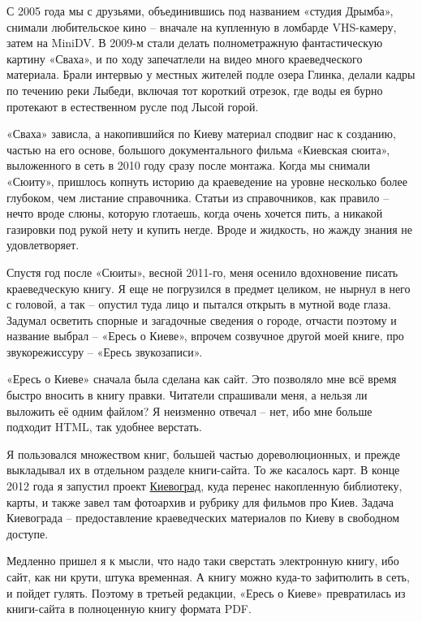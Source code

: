 С 2005 года мы с друзьями, объединившись под названием «студия Дрымба», снимали любительское кино – вначале на купленную в ломбарде VHS-камеру, затем на MiniDV. В 2009-м стали делать полнометражную фантастическую картину «Сваха», и по ходу запечатлели на видео много краеведческого материала. Брали интервью у местных жителей подле озера Глинка, делали кадры по течению реки Лыбеди, включая тот короткий отрезок, где воды ея бурно протекают в естественном русле под Лысой горой.

«Сваха» зависла, а накопившийся по Киеву материал сподвиг нас к созданию, частью на его основе, большого документального фильма «Киевская сюита», выложенного в сеть в 2010 году сразу после монтажа. Когда мы снимали «Сюиту», пришлось копнуть историю да краеведение на уровне несколько более глубоком, чем листание справочника. Статьи из справочников, как правило – нечто вроде слюны, которую глотаешь, когда очень хочется пить, а никакой газировки под рукой нету и купить негде. Вроде и жидкость, но жажду знания не удовлетворяет.

Спустя год после «Сюиты», весной 2011-го, меня осенило вдохновение писать краеведческую книгу. Я еще не погрузился в предмет целиком, не нырнул в него с головой, а так – опустил туда лицо и пытался открыть в мутной воде глаза. Задумал осветить спорные и загадочные сведения о городе, отчасти поэтому и название выбрал – «Ересь о Киеве», впрочем созвучное другой моей книге, про звукорежиссуру – «Ересь звукозаписи».

«Ересь о Киеве» сначала была сделана как сайт. Это позволяло мне всё время быстро вносить в книгу правки. Читатели спрашивали меня, а нельзя ли выложить её одним файлом? Я неизменно отвечал – нет, ибо мне больше подходит HTML, так удобнее верстать.

Я пользовался множеством книг, большей частью дореволюционных, и прежде выкладывал их в отдельном разделе книги-сайта. То же касалось карт. В конце 2012 года я запустил проект \href{http://semiletov.org/kievograd}{Киевоград}, куда перенес накопленную библиотеку, карты, и также завел там фотоархив и рубрику для фильмов про Киев. Задача Киевограда – предоставление краеведческих материалов по Киеву в свободном доступе.

Медленно пришел я к мысли, что надо таки сверстать электронную книгу, ибо сайт, как ни крути, штука временная. А книгу можно куда-то зафитюлить в сеть, и пойдет гулять. Поэтому в третьей редакции, «Ересь о Киеве» превратилась из книги-сайта в полноценную книгу формата PDF.

